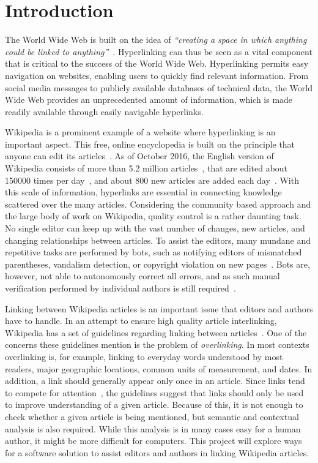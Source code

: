 \chapter{Introduction}\label{ch:introduction}

The World Wide Web is built on the idea of \emph{``creating a space in which anything could be linked to anything''}~\cite[p.~4]{Weaving-the-web}. Hyperlinking can thus be seen as a vital component that is critical to the success of the World Wide Web. Hyperlinking permits easy navigation on websites, enabling users to quickly find relevant  information. From social media messages to publicly available databases of technical data, the World Wide Web provides an unprecedented amount of information, which is made readily available through easily navigable hyperlinks.

Wikipedia is a prominent example of a website where hyperlinking is an important aspect. This free, online encyclopedia is built on the principle that anyone can edit its articles~\cite{wiki-about}. As of October 2016, the English version of Wikipedia consists of more than 5.2 million articles~\cite{wiki-about}, that are edited about \num{150000} times per day~\cite{wiki-num-edits}, and about 800 new articles are added each day~\cite{wmcharts}. With this scale of information, hyperlinks are essential in connecting knowledge scattered over the many articles. Considering the community based approach and the large body of work on Wikipedia, quality control is a rather daunting task. No single editor can keep up with the vast number of changes, new articles, and changing relationships between articles. To assist the editors, many mundane and repetitive tasks are performed by bots, such as notifying editors of mismatched parentheses, vandalism detection, or copyright violation on new pages~\cite{wiki-bots}. Bots are, however, not able to autonomously correct all errors, and as such manual verification performed by individual authors is still required~\cite{wiki-bot-policy}.

Linking between Wikipedia articles is an important issue that editors and authors have to handle. In an attempt to ensure high quality article interlinking, Wikipedia has a set of guidelines regarding linking between articles~\cite{wiki-manual-of-style-overlinking}. One of the concerns these guidelines mention is the problem of \emph{overlinking}. In most contexts overlinking is, for example, linking to everyday words understood by most readers, major geographic locations, common units of measurement, and dates. In addition, a link should generally appear only once in an article. Since links tend to compete for attention~\cite{hyperlink-structure-using-logs}, the guidelines suggest that links should only be used to improve understanding of a given article. Because of this, it is not enough to check whether a given article is being mentioned, but semantic and contextual analysis is also required. While this analysis is in many cases easy for a human author, it might be more difficult for computers. This project will explore ways for a software solution to assist editors and authors in linking Wikipedia articles.






